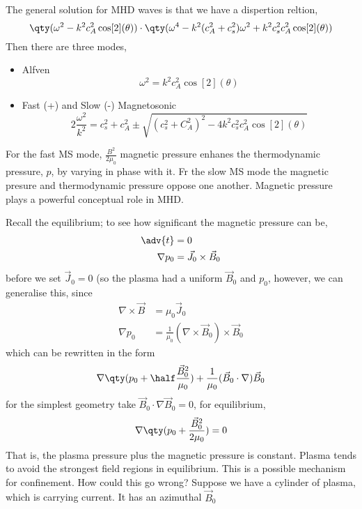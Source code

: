 \documentclass{book}         		                %
\begin{document}
The general solution for MHD waves is that we have a dispertion
reltion, 
\[ \qty(\omega^2 - k^2 c_A^2 \cos[2](\theta) ) \cdot \qty( \omega^4 - k^2( c_A^2 + c_s^2) \omega^2 + k^2c_s^2c_A^2 \cos[2](\theta)) \]
Then there are three modes,
\begin{itemize}
\item Alfven \[ \omega^2 = k^2 c_A^2 \cos[2](\theta) \]
\item Fast (+) and Slow (-) Magnetosonic \[ 2 \frac{\omega^2}{k^2} = c_s^2 + c_A^2 \pm \sqrt{( c_s^2 + C_A^2)^2 - 4k^2 c_s^2 c_A^2 \cos[2](\theta)} \]
\end{itemize}
For the fast MS mode, $\frac{B^2}{2 \mu_0}$ magnetic pressure enhanes
the thermodynamic pressure, $p$, by varying in phase with it.  Fr the
slow MS mode the magnetic presure and thermodynamic pressure oppose
one another. Magnetic pressure plays a powerful conceptual role in
MHD.

Recall the equilibrium; to see how significant the magnetic pressure can be,
\begin{align*}
  \adv{t} &= 0\\
\nabla p_0 &= \vec{J}_0 \times \vec{B}_0 
\end{align*}
before we set $\vec{J}_0 =0$ (so the plasma had a uniform $\vec{B}_0$ and $p_0$, however, we can generalise this, since 
\begin{align*}
  \nabla \times \vec{B} &= \mu_0 \vec{J}_0 \\
\nabla p_0 &= \frac{1}{\mu_0} (\nabla \times \vec{B}_0) \times \vec{B}_0
\end{align*}
which can be rewritten in the form
\[ \nabla \qty(p_0 + \half \frac{\vec{B}_0^2}{\mu_0}) +
\frac{1}{\mu_0}( \vec{B}_0 \cdot \nabla) \vec{B}_0 \]
for the simplest geometry take $\vec{B}_0 \cdot \nabla \vec{B}_0 = 0$, for equilibrium, 
\begin{equation}
  \label{eq:equilibrium}
  \nabla \qty(p_0 + \frac{\vec{B}_0^2}{2 \mu_0} ) = 0
\end{equation}
That is, the plasma pressure plus the magnetic pressure is constant.
Plasma tends to avoid the strongest field regions in equilibrium. This is a possible mechanism for confinement. How could this go wrong? Suppose we have a cylinder of plasma, which is carrying current. It has an azimuthal $\vec{B}_0$

\end{document}
